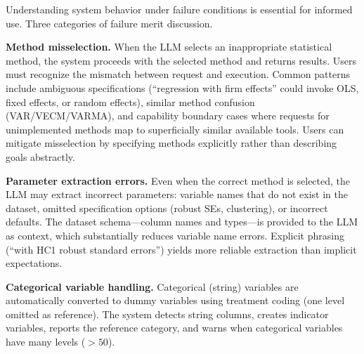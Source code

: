 Understanding system behavior under failure conditions is essential for
informed use. Three categories of failure merit discussion.

\textbf{Method misselection.}
When the LLM selects an inappropriate statistical method, the system
proceeds with the selected method and returns results. Users must
recognize the mismatch between request and execution. Common patterns
include ambiguous specifications (``regression with firm effects'' could
invoke OLS, fixed effects, or random effects), similar method confusion
(VAR/VECM/VARMA), and capability boundary cases where requests for
unimplemented methods map to superficially similar available tools.
Users can mitigate misselection by specifying methods explicitly
rather than describing goals abstractly.

\textbf{Parameter extraction errors.}
Even when the correct method is selected, the LLM may extract incorrect
parameters: variable names that do not exist in the dataset, omitted
specification options (robust SEs, clustering), or incorrect defaults.
The dataset schema---column names and types---is provided to the LLM as
context, which substantially reduces variable name errors. Explicit
phrasing (``with HC1 robust standard errors'') yields more reliable
extraction than implicit expectations.

\textbf{Categorical variable handling.}
Categorical (string) variables are automatically converted to dummy variables
using treatment coding (one level omitted as reference). The system detects
string columns, creates indicator variables, reports the reference category,
and warns when categorical variables have many levels ($>50$).
